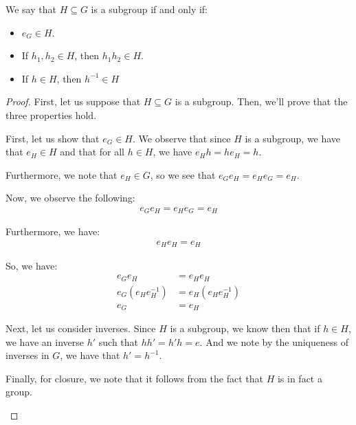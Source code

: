 \documentclass[openany]{book}
\begin{document}
\begin{prop}
	We say that $H \subseteq G$ is a subgroup if and only if:
	\begin{itemize}
		\item $e_G \in H$.
		\item If $h_1, h_2 \in H$, then $h_1h_2 \in H$.
		\item If $h \in H$, then $h^{-1} \in H$
	\end{itemize}
\end{prop}
\begin{proof}
	First, let us suppose that $H \subseteq G$ is a subgroup. Then, we'll prove that the three properties hold.
	\begin{innerproof}
		First, let us show that $e_G \in H$. We observe that since $H$ is a subgroup, we have that $e_H \in H$ and that for all $h \in H$, we have $e_H h = h e_H = h$.
		
		Furthermore, we note that $e_H \in G$, so we see that $e_G e_H = e_H e_G = e_H$.
		
		Now, we observe the following:
		\begin{align*}
			e_G e_H = e_H e_G = e_H
		\end{align*}
	
		Furthermore, we have:
		\begin{align*}
			e_H e_H = e_H
		\end{align*}
	
		So, we have:
		\begin{align*}
			e_G e_H &= e_H e_H \\
			e_G (e_H e_H^{-1}) &= e_H(e_H e_H^{-1}) \\
			e_G &= e_H
		\end{align*}
	
		Next, let us consider inverses. Since $H$ is a subgroup, we know then that if $h \in H$, we have an inverse $h'$ such that $hh' = h'h = e$. And we note by the uniqueness of inverses in $G$, we have that $h' = h^{-1}$.
		
		Finally, for closure, we note that it follows from the fact that $H$ is in fact a group.
	\end{innerproof}
\end{proof}
\end{document}
